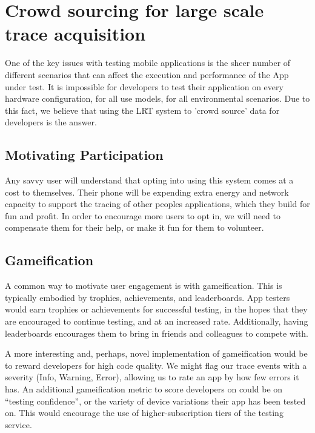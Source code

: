 \section{Crowd sourcing for large scale trace acquisition}
\label{section:crowdsourcing}
One of the key issues with testing mobile applications is the sheer number
of different scenarios that can affect the execution and performance
of the App under test. It is impossible for developers to test their application
on every hardware configuration, for all use models, for all environmental scenarios.
Due to this fact, we believe that using the LRT system to 'crowd source' data for developers
is the answer.

\subsection{Motivating Participation}
\label{subsectionsection:motivatingparticipation}
Any savvy user will understand that opting into using this system comes at a cost to themselves.
Their phone will be expending extra energy and network capacity to support the tracing of 
other peoples applications, which they build for fun and profit.
In order to encourage more users to opt in, we will need to compensate them for their
help, or make it fun for them to volunteer.

\subsection{Gameification}
A common way to motivate user engagement is with gameification. This is typically embodied
by trophies, achievements, and leaderboards. App testers would earn trophies or achievements
for successful testing, in the hopes that they are encouraged to continue testing, and at an
increased rate. Additionally, having leaderboards encourages them to bring in friends and colleagues
to compete with.

A more interesting and, perhaps, novel implementation of gameification would be to reward developers
for high code quality. We might flag our trace events with a severity (Info, Warning, Error), allowing
us to rate an app by how few errors it has. An additional gameification metric to score developers on
could be on ``testing confidence'', or the variety of device variations their app has been tested on.
This would encourage the use of higher-subscription tiers of the testing service.

